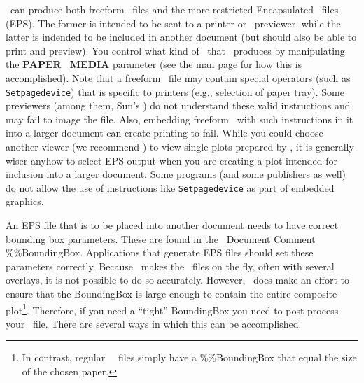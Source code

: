 \GMT\ can produce both freeform \PS\ files and the more
restricted Encapsulated \PS\ files (EPS).  The former is
intended to be sent to a printer or \PS\ previewer, while
the latter is indended to be included in another document
(but should also be able to print and preview).  You
control what kind of \PS\ that \GMT\ produces by manipulating
the {\bf PAPER\_MEDIA} parameter (see the  man
page for how this is accomplished).  Note that a freeform \PS\
file may contain special operators (such as \texttt{Setpagedevice})
that is specific to printers (e.g., selection of paper tray).
Some previewers (among them, Sun's ) do not
understand these valid instructions and may fail to image the file. Also, embedding freeform \PS\ with such instructions in it into a larger document can create printing to fail.
While you could choose another viewer (we recommend \progname{ghostview}) to view single plots prepared by \GMT, it is generally wiser anyhow to select EPS output when you are creating a plot intended for inclusion into a larger document. Some programs (and some publishers as well) do not allow the use of instructions like \texttt{Setpagedevice} as part of embedded graphics.

An EPS file that is to be placed into another document
needs to have correct bounding box
parameters.  These are found in the \PS\ Document
Comment \%\%BoundingBox.  Applications that generate EPS
files should set these parameters correctly.  Because \GMT\
makes the \PS\ files on the fly, often with several
overlays, it is not possible to do so accurately.  However,
\GMT\ does make an effort to ensure that the BoundingBox is
large enough to contain the entire composite plot\footnote{In contrast,
regular \GMT\ \PS\ files simply have
a \%\%BoundingBox that equal the size of the chosen paper.}.
Therefore, if you need a ``tight'' BoundingBox you need to post-process
your \PS\ file.  There are several ways in which this
can be accomplished.

